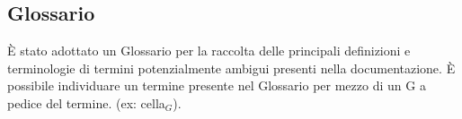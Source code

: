 \subsection{Glossario}
È stato adottato un Glossario per la raccolta delle principali definizioni e terminologie di termini potenzialmente ambigui presenti nella documentazione.
È possibile individuare un termine presente nel Glossario per mezzo di un G a pedice del termine.
(ex: cella\(_G\)).